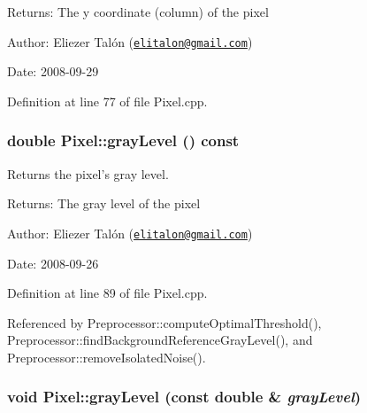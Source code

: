 \begin{Desc}
\item[Returns:]The y coordinate (column) of the pixel\end{Desc}
\begin{Desc}
\item[Author:]Eliezer Talón (\href{mailto:elitalon@gmail.com}{\tt elitalon@gmail.com}) \end{Desc}
\begin{Desc}
\item[Date:]2008-09-29 \end{Desc}


Definition at line 77 of file Pixel.cpp.\hypertarget{class_pixel_6e445cee8bfa4475238823e0b6da42b0}{
\subsubsection[grayLevel]{\setlength{\rightskip}{0pt plus 5cm}double Pixel::grayLevel () const}}
\label{class_pixel_6e445cee8bfa4475238823e0b6da42b0}


Returns the pixel's gray level. 

\begin{Desc}
\item[Returns:]The gray level of the pixel\end{Desc}
\begin{Desc}
\item[Author:]Eliezer Talón (\href{mailto:elitalon@gmail.com}{\tt elitalon@gmail.com}) \end{Desc}
\begin{Desc}
\item[Date:]2008-09-26 \end{Desc}


Definition at line 89 of file Pixel.cpp.

Referenced by Preprocessor::computeOptimalThreshold(), Preprocessor::findBackgroundReferenceGrayLevel(), and Preprocessor::removeIsolatedNoise().\hypertarget{class_pixel_5f287c6a53167076bc8f1ce54e74e38d}{
\subsubsection[grayLevel]{\setlength{\rightskip}{0pt plus 5cm}void Pixel::grayLevel (const double \& {\em grayLevel})}}
\label{class_pixel_5f287c6a53167076bc8f1ce54e74e38d}


